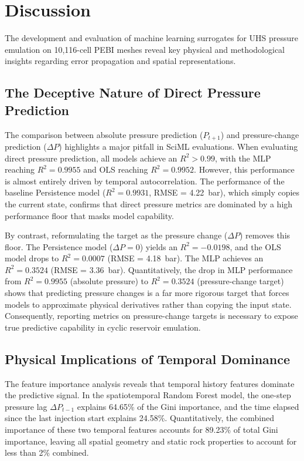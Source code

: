 \section{Discussion}
The development and evaluation of machine learning surrogates for UHS pressure emulation on 10,116-cell PEBI meshes reveal key physical and methodological insights regarding error propagation and spatial representations.

\subsection{The Deceptive Nature of Direct Pressure Prediction}
The comparison between absolute pressure prediction ($P_{t+1}$) and pressure-change prediction ($\Delta P$) highlights a major pitfall in SciML evaluations. When evaluating direct pressure prediction, all models achieve an $R^2 > 0.99$, with the MLP reaching $R^2 = 0.9955$ and OLS reaching $R^2 = 0.9952$. However, this performance is almost entirely driven by temporal autocorrelation. The performance of the baseline Persistence model ($R^2 = 0.9931$, RMSE = 4.22~bar), which simply copies the current state, confirms that direct pressure metrics are dominated by a high performance floor that masks model capability.

By contrast, reformulating the target as the pressure change ($\Delta P$) removes this floor. The Persistence model ($\Delta P = 0$) yields an $R^2 = -0.0198$, and the OLS model drops to $R^2 = 0.0007$ (RMSE = 4.18~bar). The MLP achieves an $R^2 = 0.3524$ (RMSE = 3.36~bar). Quantitatively, the drop in MLP performance from $R^2 = 0.9955$ (absolute pressure) to $R^2 = 0.3524$ (pressure-change target) shows that predicting pressure changes is a far more rigorous target that forces models to approximate physical derivatives rather than copying the input state. Consequently, reporting metrics on pressure-change targets is necessary to expose true predictive capability in cyclic reservoir emulation.

\subsection{Physical Implications of Temporal Dominance}
The feature importance analysis reveals that temporal history features dominate the predictive signal. In the spatiotemporal Random Forest model, the one-step pressure lag $\Delta P_{t-1}$ explains 64.65\% of the Gini importance, and the time elapsed since the last injection start explains 24.58\%. Quantitatively, the combined importance of these two temporal features accounts for 89.23\% of total Gini importance, leaving all spatial geometry and static rock properties to account for less than 2\% combined.

